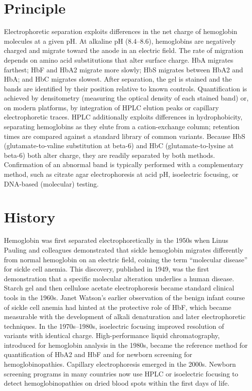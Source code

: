 \section*{Principle}
Electrophoretic separation exploits differences in the net charge of hemoglobin molecules at a given pH. At alkaline pH (8.4--8.6), hemoglobins are negatively charged and migrate toward the anode in an electric field. The rate of migration depends on amino acid substitutions that alter surface charge. HbA migrates farthest; HbF and HbA2 migrate more slowly; HbS migrates between HbA2 and HbA; and HbC migrates slowest. After separation, the gel is stained and the bands are identified by their position relative to known controls. Quantification is achieved by densitometry (measuring the optical density of each stained band) or, on modern platforms, by integration of HPLC elution peaks or capillary electrophoretic traces. HPLC additionally exploits differences in hydrophobicity, separating hemoglobins as they elute from a cation-exchange column; retention times are compared against a standard library of common variants. Because HbS (glutamate-to-valine substitution at beta-6) and HbC (glutamate-to-lysine at beta-6) both alter charge, they are readily separated by both methods. Confirmation of an abnormal band is typically performed with a complementary method, such as citrate agar electrophoresis at acid pH, isoelectric focusing, or DNA-based (molecular) testing.

\section*{History}
Hemoglobin was first separated electrophoretically in the 1950s when Linus Pauling and colleagues demonstrated that sickle hemoglobin migrates differently from normal hemoglobin on an electric field, coining the term ``molecular disease'' for sickle cell anemia. This discovery, published in 1949, was the first demonstration that a specific molecular alteration underlies a human disease. Starch gel and then cellulose acetate electrophoresis became standard clinical tools in the 1960s. Janet Watson's earlier observation of the benign infant course of sickle cell anemia had hinted at the protective role of HbF, which became measurable with the development of alkali denaturation and later electrophoretic techniques. In the 1970s--1980s, isoelectric focusing improved resolution of variants with identical charge. High-performance liquid chromatography, introduced for hemoglobin analysis in the 1980s, became the reference method for quantification of HbA2 and HbF and for newborn screening for hemoglobinopathies. Capillary electrophoresis emerged in the 2000s. Newborn screening programs in many countries now use HPLC or isoelectric focusing to detect hemoglobinopathies on dried blood spots within the first days of life.

